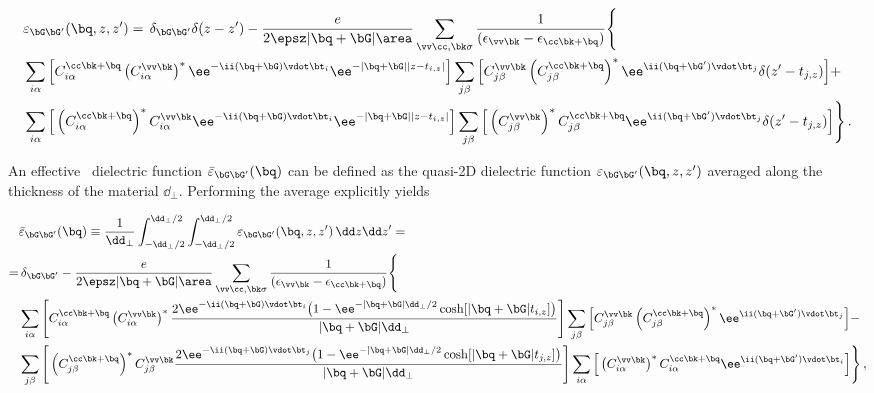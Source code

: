 \begin{align}
    \label{eq:quasi_2D_dielectric_function_final}
    & \varepsilon_{\bG \bG'}(\bq,z,z') =  \,\delta_{\bG \bG'} \delta( z-z')-\frac{e}{2\epsz |\bq +\bG|\area}\sum_{\vv \cc, \bk \sigma}\frac{1}{( \epsilon_{\vv\bk}-\epsilon_{\cc\bk+\bq })}\Bigg\{\\ 
    & \sum_{i\alpha} \Big[C_{i\alpha}^{\cc \bk+\bq} \left(C_{i\alpha}^{\vv\bk}\right)^{*} \ee^{-\ii (\bq +\bG) \vdot\bt_{i}} \ee^{-|\bq +\bG||z-t_{i,z}|}\Big] \sum_{j\beta}\Big[C_{j\beta}^{\vv\bk}\left(C_{j\beta}^{\cc\bk+\bq }\right)^{*} \ee^{\ii (\bq +\bG') \vdot \bt_{j}} \delta(z' - t_{j,z})\Big]+  \notag\\
    & \sum_{i\alpha} \Big[\left(C_{i\alpha}^{\cc\bk+\bq }\right)^{*}C_{i\alpha}^{\vv\bk} \ee^{-\ii (\bq +\bG) \vdot\bt_{i}} \ee^{-|\bq +\bG||z-t_{i,z}|}\Big] \sum_{j\beta}\Big[\left(C_{j\beta}^{\vv\bk}\right)^{*}C_{j\beta}^{\cc\bk+\bq } \ee^{\ii (\bq +\bG') \vdot \bt_{j}} \delta(z' - t_{j,z})\Big]\Bigg\} \,. \notag
\end{align}

\noindent An effective \bd~dielectric function $\bar{\varepsilon}_{\bG \bG'}(\bq)$ can be defined as the quasi-2D dielectric function $\varepsilon_{\bG \bG'}(\bq,z,z')$ averaged along the thickness of the material $\dd_{\perp}$.
Performing the average explicitly yields

\begin{align}
    \label{eq:quasi_2D_averaged_dielectric_function}
    & \bar{\varepsilon}_{\bG \bG'}(\bq) \equiv \frac{1}{\dd_{\perp}} \int_{-\dd_{\perp}/2}^{\dd_{\perp}/2} \int_{-\dd_{\perp}/2}^{\dd_{\perp}/2} \varepsilon_{\bG \bG'}(\bq,z,z')\,\dd z\dd z' = \\
    =& \,\delta_{\bG \bG'} - \frac{e}{2\epsz |\bq +\bG|\area}\sum_{\vv \cc,\bk \sigma}\frac{1}{( \epsilon_{\vv\bk}-\epsilon_{\cc\bk+\bq })} \Bigg\{ \notag  \\
    & \sum_{i\alpha} \Bigg[C_{i\alpha}^{\cc\bk+\bq }\left(C_{i\alpha}^{\vv\bk}\right)^{*}\frac{2\ee^{-\ii(\bq +\bG) \vdot\bt_{i}}\big(1-\ee^{-|\bq +\bG| \dd_{\perp}/2}\cosh[ |\bq +\bG|t_{i,z}]\big)}{|\bq +\bG| \dd_{\perp}}\Bigg]\sum_{j\beta}\Big[C_{j\beta}^{\vv\bk}\left(C_{j\beta}^{\cc\bk+\bq }\right)^{*} \ee^{\ii (\bq +\bG') \vdot \bt_{j}}\Big] - \notag\\
    & \sum_{j\beta} \Bigg[\left(C_{j\beta}^{\cc\bk+\bq }\right)^{*}C_{j\beta}^{\vv\bk}\frac{2\ee^{-\ii(\bq +\bG) \vdot \bt_{j}}\big(1-\ee^{-|\bq +\bG| \dd_{\perp}/2}\cosh[ |\bq +\bG|t_{j,z}]\big)}{|\bq +\bG| \dd_{\perp}}\Bigg]  \sum_{i\alpha}\Big[\left(C_{i\alpha}^{\vv\bk}\right)^{*}C_{i\alpha}^{\cc\bk+\bq } \ee^{\ii (\bq +\bG') \vdot \bt_{i}}\Big]\Bigg\}\,, \notag
\end{align}

